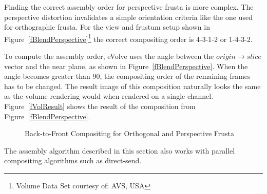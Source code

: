 \documentclass[10pt,a4]{scrartcl}
\newcommand{\fig}[1]{Figure~\ref{#1}}
\begin{document}
Finding the correct assembly order for perspective frusta is more
complex. The perspective distortion invalidates a simple orientation
criteria like the one used for orthographic frusta. For the view and
frustum setup shown in \fig{fBlendPerspective}\footnote{Volume Data Set
  courtesy of: AVS, USA} the correct compositing order is 4-3-1-2 or
1-4-3-2.

To compute the assembly order, \textsf{eVolve} uses the angle between
the $origin \rightarrow slice$ vector and the near plane, as shown in
\fig{fBlendPerspective}. When the angle becomes greater than
90\textdegree, the compositing order of the remaining frames has to be
changed. The result image of this composition naturally looks the same
as the volume rendering would when rendered on a single
channel. \fig{fVolResult} shows the result of the composition from
\fig{fBlendPerspective}.

\begin{figure}[h!t]
  \hfil
  {\caption{\label{fBlend}Back-to-Front Com\-po\-siting for
      Orthogonal and Perspective Frusta}}
\end{figure}

The assembly algorithm described in this section also works with parallel
compositing algorithms such as direct-send. 
\end{document}
